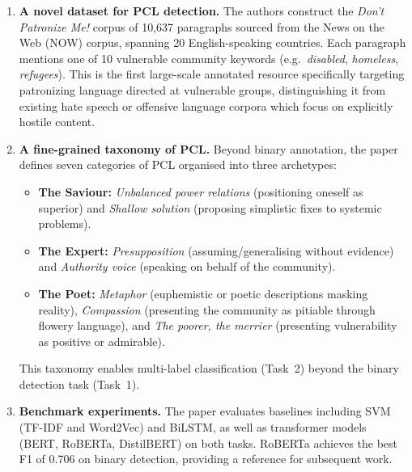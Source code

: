 \documentclass[11pt,a4paper]{article}
\begin{document}
\begin{enumerate}[leftmargin=*]
    \item \textbf{A novel dataset for PCL detection.}
    The authors construct the \emph{Don't Patronize Me!} corpus of 10,637
    paragraphs sourced from the News on the Web (NOW) corpus, spanning 20
    English-speaking countries. Each paragraph mentions one of 10 vulnerable
    community keywords (e.g.\ \emph{disabled}, \emph{homeless},
    \emph{refugees}). This is the first large-scale annotated resource
    specifically targeting patronizing language directed at vulnerable groups,
    distinguishing it from existing hate speech or offensive language corpora
    which focus on explicitly hostile content.

    \item \textbf{A fine-grained taxonomy of PCL.}
    Beyond binary annotation, the paper defines seven categories of PCL
    organised into three archetypes:
    \begin{itemize}
        \item \textbf{The Saviour:} \emph{Unbalanced power relations}
              (positioning oneself as superior) and \emph{Shallow solution}
              (proposing simplistic fixes to systemic problems).
        \item \textbf{The Expert:} \emph{Presupposition}
              (assuming/generalising without evidence) and \emph{Authority
              voice} (speaking on behalf of the community).
        \item \textbf{The Poet:} \emph{Metaphor} (euphemistic or poetic
              descriptions masking reality), \emph{Compassion} (presenting
              the community as pitiable through flowery language), and
              \emph{The poorer, the merrier} (presenting vulnerability as
              positive or admirable).
    \end{itemize}
    This taxonomy enables multi-label classification (Task~2) beyond the
    binary detection task (Task~1).

    \item \textbf{Benchmark experiments.}
    The paper evaluates baselines including SVM (TF-IDF and Word2Vec)
    and BiLSTM, as well as transformer models (BERT, RoBERTa,
    DistilBERT) on both tasks. RoBERTa achieves the best F1 of 0.706
    on binary detection, providing a reference for subsequent work.
\end{enumerate}

\end{document}
